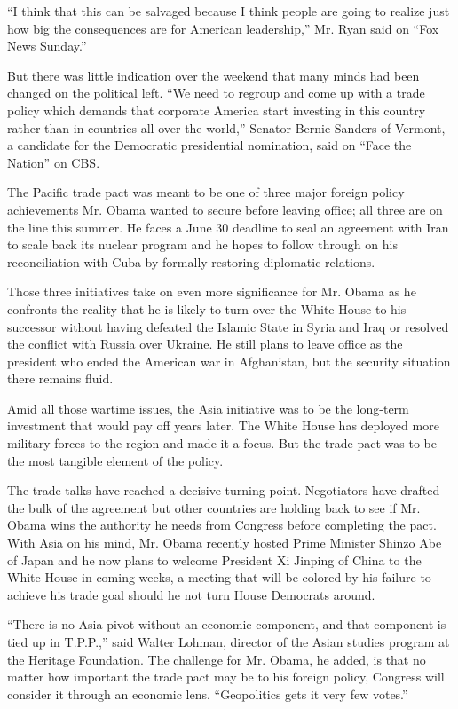 ``I think that this can be salvaged because I think people are going to
realize just how big the consequences are for American leadership,'' Mr.
Ryan said on ``Fox News Sunday.''

But there was little indication over the weekend that many minds had
been changed on the political left. ``We need to regroup and come up
with a trade policy which demands that corporate America start investing
in this country rather than in countries all over the world,'' Senator
Bernie Sanders of Vermont, a candidate for the Democratic presidential
nomination, said on ``Face the Nation'' on CBS.

The Pacific trade pact was meant to be one of three major foreign policy
achievements Mr. Obama wanted to secure before leaving office; all three
are on the line this summer. He faces a June 30 deadline to seal an
agreement with Iran to scale back its nuclear program and he hopes to
follow through on his reconciliation with Cuba by formally restoring
diplomatic relations.

Those three initiatives take on even more significance for Mr. Obama as
he confronts the reality that he is likely to turn over the White House
to his successor without having defeated the Islamic State in Syria and
Iraq or resolved the conflict with Russia over Ukraine. He still plans
to leave office as the president who ended the American war in
Afghanistan, but the security situation there remains fluid.

Amid all those wartime issues, the Asia initiative was to be the
long-term investment that would pay off years later. The White House has
deployed more military forces to the region and made it a focus. But the
trade pact was to be the most tangible element of the policy.

The trade talks have reached a decisive turning point. Negotiators have
drafted the bulk of the agreement but other countries are holding back
to see if Mr. Obama wins the authority he needs from Congress before
completing the pact. With Asia on his mind, Mr. Obama recently hosted
Prime Minister Shinzo Abe of Japan and he now plans to welcome President
Xi Jinping of China to the White House in coming weeks, a meeting that
will be colored by his failure to achieve his trade goal should he not
turn House Democrats around.

``There is no Asia pivot without an economic component, and that
component is tied up in T.P.P.,'' said Walter Lohman, director of the
Asian studies program at the Heritage Foundation. The challenge for Mr.
Obama, he added, is that no matter how important the trade pact may be
to his foreign policy, Congress will consider it through an economic
lens. ``Geopolitics gets it very few votes.''

